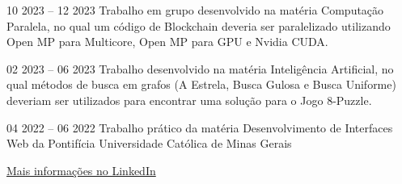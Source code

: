 {
}{10 2023 -- 12 2023}{}
Trabalho em grupo desenvolvido na matéria Computação Paralela, no qual um código de Blockchain deveria ser paralelizado utilizando Open MP para Multicore, Open MP para GPU e Nvidia CUDA.\\
\divider
        
{
}{02 2023 -- 06 2023}{}
Trabalho desenvolvido na matéria Inteligência Artificial, no qual métodos de busca em grafos (A Estrela, Busca Gulosa e Busca Uniforme) deveriam ser utilizados para encontrar uma solução para o Jogo 8-Puzzle.\\
\divider

{
}{04 2022 -- 06 2022}{}
Trabalho prático da matéria Desenvolvimento de Interfaces Web da Pontifícia Universidade Católica de Minas Gerais\\
\divider

{\large\color{emphasis}\href{https://www.linkedin.com/in/henriquemcc/details/projects/}{Mais informações no LinkedIn}}